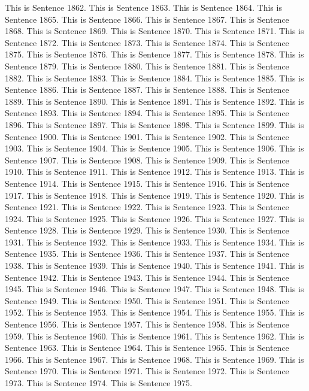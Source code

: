 \documentclass{article}
\begin{document}
This is Sentence 1862.
This is Sentence 1863.
This is Sentence 1864.
This is Sentence 1865.
This is Sentence 1866.
This is Sentence 1867.
This is Sentence 1868.
This is Sentence 1869.
This is Sentence 1870.
This is Sentence 1871.
This is Sentence 1872.
This is Sentence 1873.
This is Sentence 1874.
This is Sentence 1875.
This is Sentence 1876.
This is Sentence 1877.
This is Sentence 1878.
This is Sentence 1879.
This is Sentence 1880.
This is Sentence 1881.
This is Sentence 1882.
This is Sentence 1883.
This is Sentence 1884.
This is Sentence 1885.
This is Sentence 1886.
This is Sentence 1887.
This is Sentence 1888.
This is Sentence 1889.
This is Sentence 1890.
This is Sentence 1891.
This is Sentence 1892.
This is Sentence 1893.
This is Sentence 1894.
This is Sentence 1895.
This is Sentence 1896.
This is Sentence 1897.
This is Sentence 1898.
This is Sentence 1899.
This is Sentence 1900.
This is Sentence 1901.
This is Sentence 1902.
This is Sentence 1903.
This is Sentence 1904.
This is Sentence 1905.
This is Sentence 1906.
This is Sentence 1907.
This is Sentence 1908.
This is Sentence 1909.
This is Sentence 1910.
This is Sentence 1911.
This is Sentence 1912.
This is Sentence 1913.
This is Sentence 1914.
This is Sentence 1915.
This is Sentence 1916.
This is Sentence 1917.
This is Sentence 1918.
This is Sentence 1919.
This is Sentence 1920.
This is Sentence 1921.
This is Sentence 1922.
This is Sentence 1923.
This is Sentence 1924.
This is Sentence 1925.
This is Sentence 1926.
This is Sentence 1927.
This is Sentence 1928.
This is Sentence 1929.
This is Sentence 1930.
This is Sentence 1931.
This is Sentence 1932.
This is Sentence 1933.
This is Sentence 1934.
This is Sentence 1935.
This is Sentence 1936.
This is Sentence 1937.
This is Sentence 1938.
This is Sentence 1939.
This is Sentence 1940.
This is Sentence 1941.
This is Sentence 1942.
This is Sentence 1943.
This is Sentence 1944.
This is Sentence 1945.
This is Sentence 1946.
This is Sentence 1947.
This is Sentence 1948.
This is Sentence 1949.
This is Sentence 1950.
This is Sentence 1951.
This is Sentence 1952.
This is Sentence 1953.
This is Sentence 1954.
This is Sentence 1955.
This is Sentence 1956.
This is Sentence 1957.
This is Sentence 1958.
This is Sentence 1959.
This is Sentence 1960.
This is Sentence 1961.
This is Sentence 1962.
This is Sentence 1963.
This is Sentence 1964.
This is Sentence 1965.
This is Sentence 1966.
This is Sentence 1967.
This is Sentence 1968.
This is Sentence 1969.
This is Sentence 1970.
This is Sentence 1971.
This is Sentence 1972.
This is Sentence 1973.
This is Sentence 1974.
This is Sentence 1975.
\end{document}
